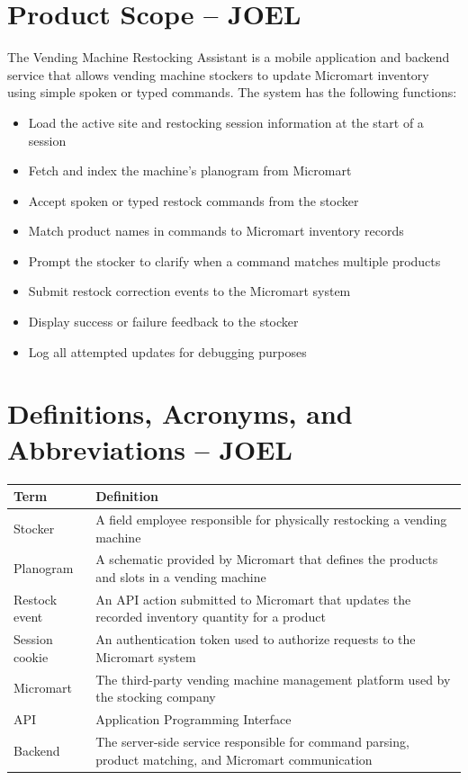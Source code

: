\documentclass{scrreprt}
\begin{document}
\section{Product Scope -- JOEL}
The Vending Machine Restocking Assistant is a mobile application and backend service that allows vending machine stockers to update Micromart inventory using simple spoken or typed commands. The system has the following functions:
\begin{itemize}
    \item Load the active site and restocking session information at the start of a session
    \item Fetch and index the machine's planogram from Micromart
    \item Accept spoken or typed restock commands from the stocker
    \item Match product names in commands to Micromart inventory records
    \item Prompt the stocker to clarify when a command matches multiple products
    \item Submit restock correction events to the Micromart system
    \item Display success or failure feedback to the stocker
    \item Log all attempted updates for debugging purposes
\end{itemize}

\section{Definitions, Acronyms, and Abbreviations -- JOEL}
\begin{tabular}{|p{4cm}|p{10cm}|}
\hline
\textbf{Term} & \textbf{Definition} \\
\hline
Stocker & A field employee responsible for physically restocking a vending machine \\
\hline
Planogram & A schematic provided by Micromart that defines the products and slots in a vending machine \\
\hline
Restock event & An API action submitted to Micromart that updates the recorded inventory quantity for a product \\
\hline
Session cookie & An authentication token used to authorize requests to the Micromart system \\
\hline
Micromart & The third-party vending machine management platform used by the stocking company \\
\hline
API & Application Programming Interface \\
\hline
Backend & The server-side service responsible for command parsing, product matching, and Micromart communication \\
\hline
\end{tabular}
\end{document}
